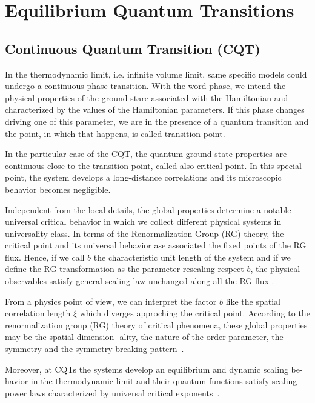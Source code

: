 \section{Equilibrium Quantum Transitions}

\subsection{Continuous Quantum Transition (CQT)}
\label{CQTeq}

In the thermodynamic limit, i.e. infinite volume limit, same specific models could undergo a continuous phase transition. With the word phase, we intend the physical properties of the ground stare associated with the Hamiltonian and characterized by the values of the Hamiltonian parameters. If this phase changes driving one of this parameter, we are in the presence of a quantum transition and the point, in which that happens, is called transition point.

In the particular case of the CQT, the quantum ground-state properties are continuous close to the transition point, called also critical point. 
In this special point, the system develops a long-distance correlations and its microscopic behavior becomes negligible.

Independent from the local details, the global properties determine a notable universal critical behavior in which we collect different physical systems in universality class.
In terms of the Renormalization Group (RG) theory, the critical point and its universal behavior ase associated the fixed points of the RG flux. Hence, if we call $b$ the characteristic unit length of the system and if we define the RG transformation as the parameter rescaling respect $b$, the physical observables satisfy general scaling law unchanged along all the RG flux \cite{S99}.

From a physics point of view, we can interpret the factor $b$ like the spatial correlation length $\xi$ which diverges approching the critical point.
According to the renormalization group (RG)
theory of critical phenomena, these global properties may be the spatial dimension-
ality, the nature of the order parameter, the symmetry and the symmetry-breaking
pattern~\cite{PV2002}.

Moreover, at CQTs the systems develop an equilibrium and dynamic scaling be-
havior in the thermodynamic limit and their quantum functions satisfy scaling
power laws characterized by universal critical exponents~\cite{CV2014}.

